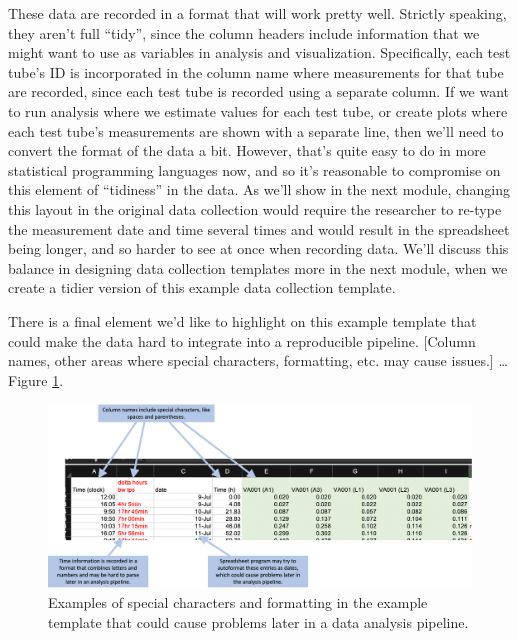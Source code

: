 \documentclass[]{tufte-book}
\begin{document}
These data are recorded in a format that will work pretty well. Strictly speaking, they
aren't full ``tidy'', since the column headers include information that we might want to
use as variables in analysis and visualization. Specifically, each test tube's ID is
incorporated in the column name where measurements for that tube are recorded, since
each test tube is recorded using a separate column. If we want to run analysis where we
estimate values for each test tube, or create plots where each test tube's measurements
are shown with a separate line, then we'll need to convert the format of the data a bit.
However, that's quite easy to do in more statistical programming languages now, and so it's
reasonable to compromise on this element of ``tidiness'' in the data. As we'll show in the
next module, changing this layout in the original data collection would require the researcher
to re-type the measurement date and time several times and would result in the spreadsheet
being longer, and so harder to see at once when recording data. We'll discuss this balance
in designing data collection templates more in the next module, when we create a tidier version
of this example data collection template.

There is a final element we'd like to highlight on this example template that could make the
data hard to integrate into a reproducible pipeline. {[}Column names, other areas where special
characters, formatting, etc. may cause issues.{]} \ldots{} Figure \ref{fig:growthformatting}.

\begin{figure}
\includegraphics[width=\textwidth]{figures/growth_curve_formatting} \caption[Examples of special characters and formatting in the example template that could cause problems later in a data analysis pipeline]{Examples of special characters and formatting in the example template that could cause problems later in a data analysis pipeline.}\label{fig:growthformatting}
\end{figure}
\end{document}
